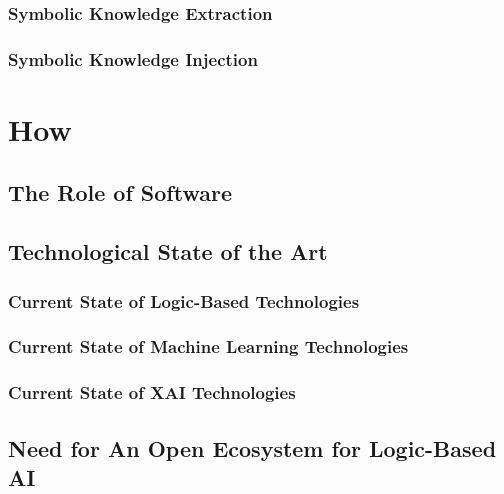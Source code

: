 \documentclass[12pt,a4paper,openright,twoside]{book}
\begin{document}
\section{Symbolic Knowledge Extraction}

\cite{aco-extraamas2021-shallow2deep}
\cite{xailp-woa2019}

\section{Symbolic Knowledge Injection}

\cite{nsc4xai-woa2020}

\part{How}
\label{part:how}

\chapter{The Role of Software}

\chapter{Technological State of the Art}

\cite{coordination-jlamp2020}

\section{Current State of Logic-Based Technologies}

\cite{lptech4mas-aamas2021}
\cite{lptech4mas-jaamas35}
\cite{logictech-information11}

\section{Current State of Machine Learning Technologies}

\section{Current State of XAI Technologies}

\cite{xaisurvey-ia14}

\chapter{Need for An Open Ecosystem for Logic-Based AI}
\end{document}
